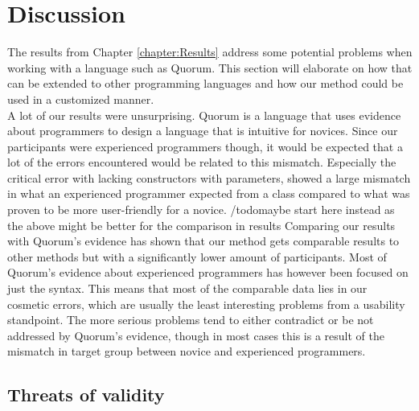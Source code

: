 \chapter{Discussion}
The results from Chapter \ref{chapter:Results} address some potential problems when working with a language such as Quorum. This section will elaborate on how that can be extended to other programming languages and how our method could be used in a customized manner.
\\
A lot of our results were unsurprising.
Quorum is a language that uses evidence about programmers to design a language that is intuitive for novices.
Since our participants were experienced programmers though, it would be expected that a lot of the errors encountered would be related to this mismatch.
Especially the critical error with lacking constructors with parameters, showed a large mismatch in what an experienced programmer expected from a class compared to what was proven to be more user-friendly for a novice.
/todo{maybe start here instead as the above might be better for the comparison in results}
Comparing our results with Quorum's evidence has shown that our method gets comparable results to other methods but with a significantly lower amount of participants.
Most of Quorum's evidence about experienced programmers has however been focused on just the syntax.
This means that most of the comparable data lies in our cosmetic errors, which are usually the least interesting problems from a usability standpoint.
The more serious problems tend to either contradict or be not addressed by Quorum's evidence, though in most cases this is a result of the mismatch in target group between novice and experienced programmers.






 





\section{Threats of validity}